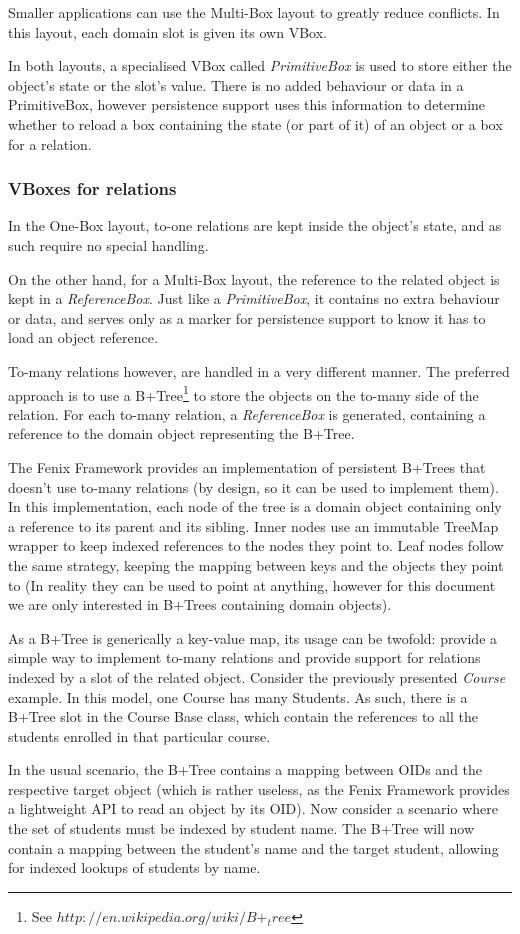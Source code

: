 Smaller applications can use the Multi-Box layout to greatly reduce
conflicts. In this layout, each domain slot is given its own VBox.

In both layouts, a specialised VBox called {\it PrimitiveBox} is
used to store either the object's state or the slot's value. There is
no added behaviour or data in a PrimitiveBox, however persistence
support uses this information to determine whether to reload a box
containing the state (or part of it) of an object or a box for a relation.

\subsubsection{VBoxes for relations}

In the One-Box layout, to-one relations are kept inside the object's
state, and as such require no special handling. 

On the other hand, for a Multi-Box layout, the reference to the
related object is kept in a {\it ReferenceBox}. Just like a {\it
  PrimitiveBox}, it contains no extra behaviour or data, and serves
only as a marker for persistence support to know it has to load an
object reference.

To-many relations however, are handled in a very different manner. The
preferred approach is to use a B+Tree\footnote{See
  $http://en.wikipedia.org/wiki/B+_tree$} to store the objects on the
to-many side of the relation. For each to-many relation, a {\it
  ReferenceBox} is generated, containing a reference to the domain
object representing the B+Tree.

The Fenix Framework provides an implementation of persistent B+Trees
that doesn't use to-many relations (by design, so it can be used to
implement them). In this implementation, each node of the tree is a
domain object containing only a reference to its parent and its
sibling. Inner nodes use an immutable TreeMap wrapper to keep indexed
references to the nodes they point to. Leaf nodes follow the same
strategy, keeping the mapping between keys and the objects they point
to (In reality they can be used to point at anything, however for this
document we are only interested in B+Trees containing domain objects).

As a B+Tree is generically a key-value map, its usage can be twofold:
provide a simple way to implement to-many relations and provide
support for relations indexed by a slot of the related
object. Consider the previously presented {\it Course} example. In
this model, one Course has many Students. As such, there is a B+Tree
slot in the Course Base class, which contain the references to all the
students enrolled in that particular course.

In the usual scenario, the B+Tree contains a mapping between OIDs and
the respective target object (which is rather useless, as the Fenix
Framework provides a lightweight API to read an object by its OID).
Now consider a scenario where the set of students must be indexed by
student name. The B+Tree will now contain a mapping between the
student's name and the target student, allowing for indexed lookups of
students by name.

